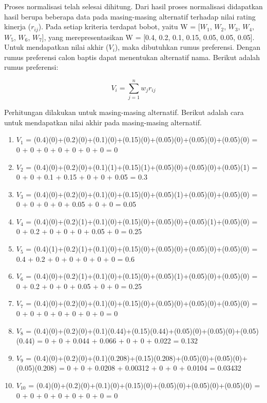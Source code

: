 Proses normalisasi telah selesai dihitung. Dari hasil proses normalisasi didapatkan hasil berupa beberapa data pada masing-masing alternatif terhadap nilai rating kinerja ($r_{ij}$). Pada setiap kriteria terdapat bobot, yaitu W = [$W_{1}$, $W_{2}$, $W_{3}$, $W_{4}$, $W_{5}$, $W_{6}$, $W_{7}$], yang merepresentasikan W = [0.4, 0.2, 0.1, 0.15, 0.05, 0.05, 0.05]. Untuk mendapatkan nilai akhir ($V_{i}$), maka dibutuhkan rumus preferensi. Dengan rumus preferensi calon baptis dapat menentukan alternatif nama. Berikut adalah rumus preferensi:

\[
 V_{i} =\displaystyle\sum_{j=1}^{n} w_{j} r_{ij}
\]


Perhitungan dilakukan untuk masing-masing alternatif. Berikut adalah cara untuk mendapatkan nilai akhir pada masing-masing alternatif.

\begin{enumerate}
	\item $V_{1}$ = (0.4)(0)+(0.2)(0)+(0.1)(0)+(0.15)(0)+(0.05)(0)+(0.05)(0)+(0.05)(0) = 0 + 0 + 0 + 0 + 0 + 0 + 0 = 0
	
	\item $V_{2}$ = (0.4)(0)+(0.2)(0)+(0.1)(1)+(0.15)(1)+(0.05)(0)+(0.05)(0)+(0.05)(1) = 0 + 0 + 0.1 + 0.15 + 0 + 0 + 0.05 = 0.3
	
	\item $V_{3}$ = (0.4)(0)+(0.2)(0)+(0.1)(0)+(0.15)(0)+(0.05)(1)+(0.05)(0)+(0.05)(0) = 0 + 0 + 0 + 0 + 0.05 + 0 + 0 = 0.05
	
	\item $V_{4}$ = (0.4)(0)+(0.2)(1)+(0.1)(0)+(0.15)(0)+(0.05)(0)+(0.05)(1)+(0.05)(0) = 0 + 0.2 + 0 + 0 + 0 + 0.05 + 0 = 0.25
	
	\item $V_{5}$ = (0.4)(1)+(0.2)(1)+(0.1)(0)+(0.15)(0)+(0.05)(0)+(0.05)(0)+(0.05)(0) = 0.4 + 0.2 + 0 + 0 + 0 + 0 + 0 = 0.6
	
	\item $V_{6}$ = (0.4)(0)+(0.2)(1)+(0.1)(0)+(0.15)(0)+(0.05)(1)+(0.05)(0)+(0.05)(0) = 0 + 0.2 + 0 + 0 + 0.05 + 0 + 0 = 0.25
	
	\item $V_{7}$ = (0.4)(0)+(0.2)(0)+(0.1)(0)+(0.15)(0)+(0.05)(0)+(0.05)(0)+(0.05)(0) = 0 + 0 + 0 + 0 + 0 + 0 + 0 = 0
	
	\item $V_{8}$ = (0.4)(0)+(0.2)(0)+(0.1)(0.44)+(0.15)(0.44)+(0.05)(0)+(0.05)(0)+(0.05)(0.44) = 0 + 0 + 0.044 + 0.066 + 0 + 0 + 0.022 = 0.132
	
	\item $V_{9}$ = (0.4)(0)+(0.2)(0)+(0.1)(0.208)+(0.15)(0.208)+(0.05)(0)+(0.05)(0)+(0.05)(0.208) = 0 + 0 + 0.0208 + 0.00312 + 0 + 0 + 0.0104 = 0.03432
	
	\item $V_{10}$ = (0.4)(0)+(0.2)(0)+(0.1)(0)+(0.15)(0)+(0.05)(0)+(0.05)(0)+(0.05)(0) = 0 + 0 + 0 + 0 + 0 + 0 + 0 = 0
\end{enumerate}

